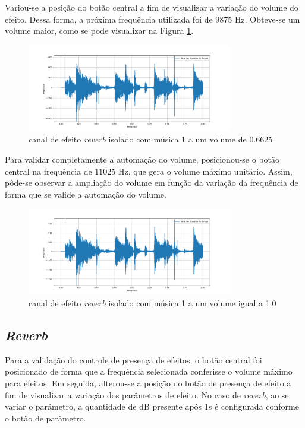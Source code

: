 Variou-se a posição do botão central a fim de visualizar a variação do volume do efeito. Dessa forma, a próxima frequência utilizada foi de 9875 Hz. Obteve-se um volume maior, como se pode visualizar na Figura \ref{fig68}.

\begin{figure}[h]
	\centering
    \includegraphics[width=0.8\textwidth]{figuras/fig68.png}
	\caption{canal de efeito \textit{reverb} isolado com música 1 a um volume de 0.6625}
	\label{fig68}
\end{figure}

Para validar completamente a automação do volume, posicionou-se o botão central na frequência de 11025 Hz, que gera o volume máximo unitário. Assim, pôde-se observar a ampliação do volume em função da variação da frequência de forma que se valide a automação do volume.

\begin{figure}[h]
	\centering
    \includegraphics[width=0.8\textwidth]{figuras/fig69.png}
	\caption{canal de efeito \textit{reverb} isolado com música 1 a um volume igual a 1.0}
	\label{fig69}
\end{figure}

\subsection{\textit{Reverb}}

Para a validação do controle de presença de efeitos, o botão central foi posicionado de forma que a frequência selecionada conferisse o volume máximo para efeitos. Em seguida, alterou-se a posição do botão de presença de efeito a fim de visualizar a variação dos parâmetros de efeito. No caso de \textit{reverb}, ao se variar o parâmetro, a quantidade de dB presente após 1s é configurada conforme o botão de parâmetro. 

